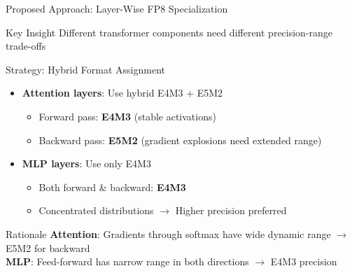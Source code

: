 \begin{frame}[squeeze]{Proposed Approach: Layer-Wise FP8 Specialization}

\begin{alertblock}{Key Insight}
\small Different transformer components need different precision-range trade-offs
\end{alertblock}

\vspace{0.2cm}

\begin{block}{Strategy: Hybrid Format Assignment}
\small
\begin{itemize}
    \item \textbf{Attention layers}: Use hybrid E4M3 + E5M2
    \begin{itemize}
        \small
        \item Forward pass: \textbf{E4M3} (stable activations)
        \item Backward pass: \textbf{E5M2} (gradient explosions need extended range)
    \end{itemize}
    \item \textbf{MLP layers}: Use only E4M3
    \begin{itemize}
        \small
        \item Both forward \& backward: \textbf{E4M3}
        \item Concentrated distributions $\rightarrow$ Higher precision preferred
    \end{itemize}
\end{itemize}
\end{block}

\vspace{0.2cm}

\begin{alertblock}{Rationale}
\small
\textbf{Attention}: Gradients through softmax have wide dynamic range $\rightarrow$ E5M2 for backward\\
\textbf{MLP}: Feed-forward has narrow range in both directions $\rightarrow$ E4M3 precision
\end{alertblock}

\end{frame}
